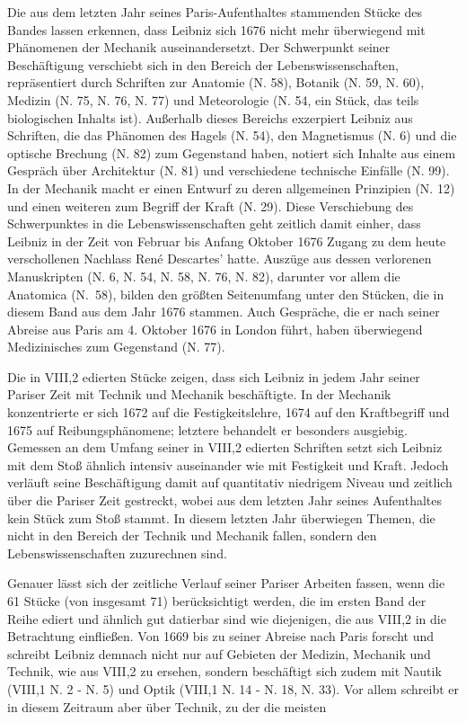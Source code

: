 Die aus dem letzten Jahr seines Paris-Aufenthaltes stammenden Stücke des Bandes lassen erkennen, dass Leibniz sich 1676 nicht mehr überwiegend mit Phänomenen der Mechanik auseinandersetzt. Der Schwerpunkt seiner Beschäftigung verschiebt sich in den Bereich der Lebenswissenschaften, repräsentiert durch Schriften zur Anatomie (N. 58), Botanik (N. 59, N. 60), Medizin (N. 75, N. 76, N. 77) und Meteorologie (N. 54, ein Stück, das teils biologischen Inhalts ist). Außerhalb dieses Bereichs exzerpiert Leibniz aus Schriften, die das Phänomen des Hagels (N. 54), den Magnetismus (N. 6) und die optische Brechung (N. 82) zum Gegenstand haben, notiert sich Inhalte aus einem Gespräch über Architektur (N. 81) und verschiedene technische Einfälle (N. 99). In der Mechanik macht er einen Entwurf zu deren allgemeinen Prinzipien (N. 12) und einen weiteren zum Begriff der Kraft (N. 29). Diese Verschiebung des Schwerpunktes in die Lebenswissenschaften geht zeitlich damit einher, dass Leibniz in der Zeit von Februar bis Anfang Oktober 1676 Zugang zu dem heute verschollenen Nachlass René Descartes' hatte. Auszüge aus dessen verlorenen Manuskripten (N. 6, N. 54, N. 58, N. 76, N. 82), darunter vor allem die Anatomica (N.~58), bilden den größten Seitenumfang unter den Stücken, die in diesem Band aus dem Jahr 1676 stammen. Auch Gespräche, die er nach seiner Abreise aus Paris am 4. Oktober 1676 in London führt, haben überwiegend Medizinisches zum Gegenstand (N. 77).\par
Die in VIII,2 edierten Stücke zeigen, dass sich Leibniz in jedem Jahr seiner Pariser Zeit mit Technik und Mechanik beschäftigte. In der Mechanik konzentrierte er sich 1672 auf die Festigkeitslehre, 1674 auf den Kraftbegriff und 1675 auf Reibungsphänomene; letztere behandelt er besonders ausgiebig. Gemessen an dem Umfang seiner in VIII,2 edierten Schriften setzt sich Leibniz mit dem Stoß ähnlich intensiv auseinander wie mit Festigkeit und Kraft. Jedoch verläuft seine Beschäftigung damit auf quantitativ niedrigem Niveau und zeitlich über die Pariser Zeit gestreckt, wobei aus dem letzten Jahr seines Aufenthaltes kein Stück zum Stoß stammt. In diesem letzten Jahr überwiegen Themen, die nicht in den Bereich der Technik und Mechanik fallen, sondern den Lebenswissenschaften zuzurechnen sind.\par 
Genauer lässt sich der zeitliche Verlauf seiner Pariser Arbeiten fassen, wenn die 61 Stücke (von insgesamt 71) berücksichtigt werden, die im ersten Band der Reihe ediert und ähnlich gut datierbar sind wie diejenigen, die aus VIII,2 in die Betrachtung einfließen. Von 1669 bis zu seiner Abreise nach Paris forscht und schreibt Leibniz demnach nicht nur auf Gebieten der Medizin, Mechanik und Technik, wie aus VIII,2 zu ersehen, sondern beschäftigt sich zudem mit Nautik (VIII,1 N. 2 - N. 5) und Optik (VIII,1 N. 14 - N. 18, N. 33). Vor allem schreibt er in diesem Zeitraum aber über Technik, zu der die meisten 
